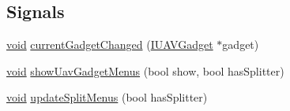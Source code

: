 \subsection*{Signals}
\begin{DoxyCompactItemize}
\item 
\hyperlink{group___u_a_v_objects_plugin_ga444cf2ff3f0ecbe028adce838d373f5c}{void} \hyperlink{group___core_plugin_ga449b6a03dd8f841eb0c2affb355c3222}{current\-Gadget\-Changed} (\hyperlink{class_core_1_1_i_u_a_v_gadget}{I\-U\-A\-V\-Gadget} $\ast$gadget)
\item 
\hyperlink{group___u_a_v_objects_plugin_ga444cf2ff3f0ecbe028adce838d373f5c}{void} \hyperlink{group___core_plugin_gada32375a929c149e998d237f69fb80c3}{show\-Uav\-Gadget\-Menus} (bool show, bool has\-Splitter)
\item 
\hyperlink{group___u_a_v_objects_plugin_ga444cf2ff3f0ecbe028adce838d373f5c}{void} \hyperlink{group___core_plugin_ga8ebf1483f2a75640eba7aff245feb214}{update\-Split\-Menus} (bool has\-Splitter)
\end{DoxyCompactItemize}
